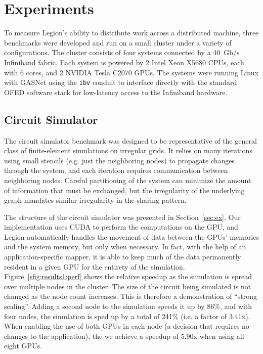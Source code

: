 \section{Experiments}
\label{sec:exp}

To measure Legion's ability to distribute work across a distributed machine, 
three benchmarks were developed and run on a small cluster under a variety
of configurations.  The cluster consists of four systems connected by a 40~Gb/s
Infiniband fabric.  Each system is powered by 2 Intel Xeon X5680 CPUs, each
with 6 cores, and 2 NVIDIA Tesla C2070 GPUs.  The systems were running Linux
with GASNet using the {\tt ibv} conduit to interface directly with the standard
OFED software stack for low-latency access to the Infiniband hardware.


\subsection{Circuit Simulator}

The circuit simulator benchmark was designed to be representative of the
general class of finite-element simulations on irregular grids.  It relies
on many iterations using small stencils (e.g. just the neighboring nodes) to
propagate changes through the system, and each iteration requires communication
between neighboring nodes.  Careful partitioning of the system can minimize
the amount of information that must be exchanged, but the irregularity of the
underlying graph mandates similar irregularity in the sharing pattern.

The structure of the circuit simulator was presented in Section~\ref{sec:ex}.
Our implementation uses CUDA to perform the computations on the GPU, and Legion
automatically handles the movement of data between the GPUs' memories and the
system memory, but only when necessary.  In fact, with the help of an
application-specific mapper, it is able to keep much of
the data permanently resident in a given GPU for the entirety of the simulation.
Figure~\ref{sfig:results1:perf} shows the relative speedup as the simulation is
spread over multiple nodes in the cluster.  The size of the circuit
being simulated is not changed as the node count increases.  This is therefore
a demonstration of ``strong scaling''.  Adding a second node to the simulation
speeds it up by 86\%, and with four nodes, the simulation is sped up by a total
of 241\% (i.e. a factor of 3.41x).  When enabling the use of both GPUs in each
node (a decision that requires no changes to the application), the we achieve
a speedup of 5.90x when using all eight GPUs.

